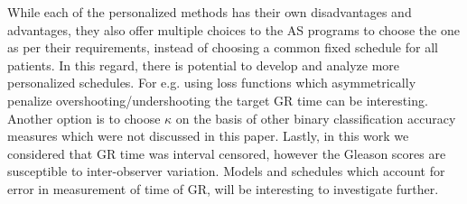 While each of the personalized methods has their own disadvantages and advantages, they also offer multiple choices to the AS programs to choose the one as per their requirements, instead of choosing a common fixed schedule for all patients. In this regard, there is potential to develop and analyze more personalized schedules. For e.g. using loss functions which asymmetrically penalize overshooting/undershooting the target GR time can be interesting. Another option is to choose $\kappa$ on the basis of other binary classification accuracy measures which were not discussed in this paper. Lastly, in this work we considered that GR time was interval censored, however the Gleason scores are susceptible to inter-observer variation. Models and schedules which account for error in measurement of time of GR, will be interesting to investigate further.
